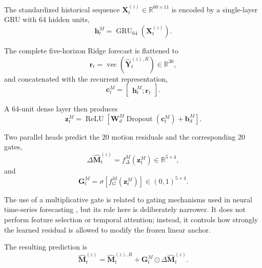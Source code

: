 The standardized historical sequence
$\mathbf X_t^{(z)}\in\mathbb R^{60\times11}$
is encoded by a single-layer GRU with 64 hidden units,
\begin{equation}
\mathbf h_t^M
=
\operatorname{GRU}_{64}
\left(
\mathbf X_t^{(z)}
\right).
\label{eq:motion_gru}
\end{equation}

The complete five-horizon Ridge forecast is flattened to
\begin{equation}
\mathbf r_t
=
\operatorname{vec}
\left(
\hat{\mathbf Y}_t^{(z),R}
\right)
\in
\mathbb R^{30},
\label{eq:ridge_context}
\end{equation}
and concatenated with the recurrent representation,
\begin{equation}
\mathbf c_t^M
=
\begin{bmatrix}
\mathbf h_t^M;
\mathbf r_t
\end{bmatrix}.
\label{eq:motion_context}
\end{equation}

A 64-unit dense layer then produces
\begin{equation}
\mathbf z_t^M
=
\operatorname{ReLU}
\left[
\mathbf W_d^M
\operatorname{Dropout}
\left(
\mathbf c_t^M
\right)
+
\mathbf b_d^M
\right].
\label{eq:motion_dense}
\end{equation}

Two parallel heads predict the 20 motion residuals and the corresponding 20 gates,
\begin{equation}
\Delta\hat{\mathbf M}_t^{(z)}
=
f_\Delta^M
\left(
\mathbf z_t^M
\right)
\in
\mathbb R^{5\times4},
\label{eq:motion_residual_head}
\end{equation}
and
\begin{equation}
\mathbf G_t^M
=
\sigma
\left[
f_G^M
\left(
\mathbf z_t^M
\right)
\right]
\in
(0,1)^{5\times4}.
\label{eq:motion_gate}
\end{equation}

The use of a multiplicative gate is related to gating mechanisms used in neural time-series forecasting \cite{Lim2021TFT}, but its role here is deliberately narrower. It does not perform feature selection or temporal attention; instead, it controls how strongly the learned residual is allowed to modify the frozen linear anchor.

The resulting prediction is
\begin{equation}
\boxed{
\hat{\mathbf M}_t^{(z)}
=
\hat{\mathbf M}_t^{(z),R}
+
\mathbf G_t^M
\odot
\Delta\hat{\mathbf M}_t^{(z)}
}.
\label{eq:motion_final}
\end{equation}

